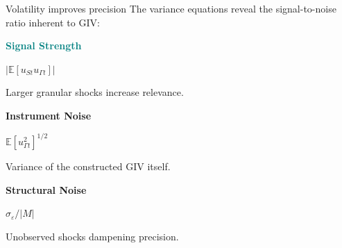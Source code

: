 \documentclass[aspectratio=169,11pt]{beamer}
\begin{document}
\begin{frame}{Volatility improves precision}
    \vspace{0.5cm}
    \centering
    The variance equations reveal the signal-to-noise ratio inherent to GIV:

    \vspace{0.8cm}
    \begin{minipage}{0.3\textwidth}
        \centering
        \textcolor{Teal}{\textbf{Signal Strength}}

        \vspace{0.2cm}
        $|\mathbb{E}[u_{St} u_{\Gamma t}]|$

        \vspace{0.2cm}
        Larger granular shocks increase relevance.
    \end{minipage}
    \hfill
    \begin{minipage}{0.3\textwidth}
        \centering
        \textcolor{WarmOrange}{\textbf{Instrument Noise}}

        \vspace{0.2cm}
        $\mathbb{E}[u_{\Gamma t}^2]^{1/2}$

        \vspace{0.2cm}
        Variance of the constructed GIV itself.
    \end{minipage}
    \hfill
    \begin{minipage}{0.3\textwidth}
        \centering
        \textcolor{SoftPurple}{\textbf{Structural Noise}}

        \vspace{0.2cm}
        $\sigma_{\varepsilon} / |M|$

        \vspace{0.2cm}
        Unobserved shocks dampening precision.
    \end{minipage}
    \vspace{0.1cm}
    \hfill \hyperlink{src_propositions}{}
\end{frame}
\end{document}
